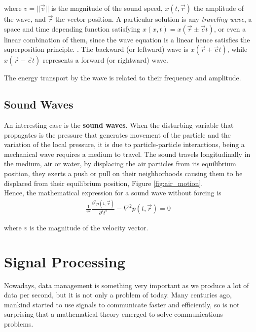where $v=||\vec{v}||$ is the magnitude of the sound speed, $x(t,\vec{r})$ the amplitude of the wave, and $\vec{r}$ the vector position. A particular solution is any \textit{traveling wave}, a space and time depending function satisfying $x(x,t) = x(\vec{r}\pm \vec{c}t)$, or even a linear combination of them, since the wave equation is a linear hence satisfies the superposition principle. \cite{book_birdsongs}. The backward (or leftward) wave is $x(\vec{r}+ \vec{c}t)$, while $x(\vec{r}-\vec{c}t)$ represents a forward (or rightward) wave.

The energy transport by the wave is related to their frequency and amplitude.

\subsection{Sound Waves}\label{subsec_sound_waves}

An interesting case is the \textbf{sound waves}. When the disturbing variable that propagates is the pressure that generates movement of the particle and the variation of the local pressure, it is due to particle-particle interactions, being a mechanical wave requires a medium to travel. The sound travels longitudinally in the medium, air or water, by displacing the air particles from its equilibrium position, they exerts a push or pull on their neighborhoods causing them to be displaced from their equilibrium position, Figure \ref{fig:air_motion}.\\

Hence, the mathematical expression for a sound wave without forcing is 
\begin{gather}\label{wave_equation}
    \frac{1}{v^2}\frac{\partial^2p(t,\vec{r})}{\partial^2 t^2} -  \nabla^2 p(t,\vec{r})  = 0
\end{gather}

where $v$ is the magnitude of the velocity vector.

\section{Signal Processing}

Nowadays, data management is something very important as we produce a lot of data per second, but it is not only a problem of today. Many centuries ago, mankind started to use signals to communicate faster and efficiently, so is not surprising that a mathematical theory emerged to solve communications problems. \\


